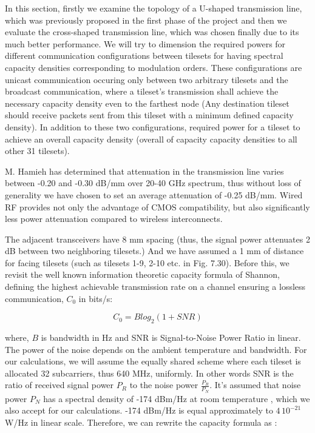 In this section, firstly we examine the topology of a U-shaped transmission line, which was previously proposed in the first phase of the project and then we evaluate the cross-shaped transmission line, which was chosen finally due to its much better performance. We will try to dimension the required powers for different communication configurations between tilesets for having spectral capacity densities corresponding to modulation orders. These configurations are unicast communication occuring only between two arbitrary tilesets and the broadcast communication, where a tileset's transmission shall achieve the necessary capacity density even to the farthest node (Any destination tileset should receive packets sent from this tileset with a minimum defined capacity density). In addition to these two configurations, required power for a tileset to achieve an overall capacity density (overall of capacity capacity densities to all other 31 tilesets). 

M. Hamieh has determined that attenuation in the transmission line varies between -0.20 and -0.30 dB/mm over 20-40 GHz spectrum, thus without loss of generality we have chosen to set an average attenuation of -0.25 dB/mm. Wired RF provides not only the advantage of CMOS compatibility, but also significantly less power attenuation compared to wireless interconnects. 

The adjacent transceivers have 8 mm spacing (thus, the signal power attenuates 2 dB between two neighboring tilesets.) And we have assumed a 1 mm of distance for facing tilesets (such as tilesets 1-9, 2-10 etc. in Fig. 7.30). 
Before this, we revisit the well known information theoretic capacity formula of Shannon, defining the highest achievable transmission rate on a channel ensuring a lossless communication, $C_{0}$ in bits/s: 

\begin{equation}
C_{0} = Blog_{2}(1+SNR) 
\end{equation}

where, $B$ is bandwidth in Hz and SNR is Signal-to-Noise Power Ratio in linear. The power of the noise depends on the ambient temperature and bandwidth. For our calculations, we will assume the equally shared scheme where each tileset is allocated 32 subcarriers, thus 640 MHz, uniformly. In other words SNR is the ratio of received signal power $P_{R}$ to the noise power $\frac{P_{R}}{P_{N}}$. It's assumed that noise power $P_{N}$ has a spectral density of -174 dBm/Hz at room temperature \cite{shankar2002introduction}, which we also accept for our calculations. -174 dBm/Hz is equal approximately to $4\,10^{-21}$ W/Hz in linear scale. Therefore, we can rewrite the capacity formula as : 

